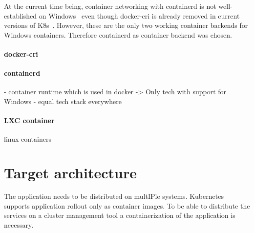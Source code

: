 At the current time being, container networking with containerd is not well-established on Windows~\cite{GitHub.20230202,GitHub.20230202b,Github.2022_258,GitHub.20230202c} even though docker-cri is already removed in current versions of \ac{K8s}~\cite{Kubernetes.2020}. However, these are the only two working container backends for Windows containers. Therefore containerd as container backend was chosen.

\paragraph{docker-cri}
\paragraph{containerd}
	- container runtime which is used in docker
	-> Only tech with support for Windows - equal tech stack everywhere
\paragraph{LXC container}
	linux containers






\section{Target architecture}
The application needs to be distributed on mult\ac{IP}le systems. Kubernetes supports application rollout only as container images. To be able to distribute the services on a cluster management tool a containerization of the application is necessary.